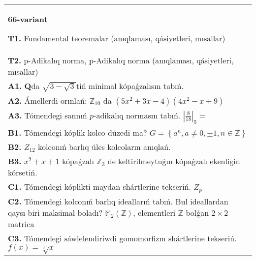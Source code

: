 \documentclass{article}
\begin{document}
\begin{tabular}{m{17cm}}
\textbf{66-variant}
\newline

\textbf{T1.} Fundamental teoremalar (anıqlaması, qásiyetleri, mısallar) \\
\textbf{T2.} p-Adikalıq norma, p-Adikalıq norma (anıqlaması, qásiyetleri, mısallar) \\
\textbf{A1.} \(\mathbf{Q}\)da \(\sqrt{3 - \sqrt{3}}\)tiń minimal kópaǵzalısın tabıń. \\
\textbf{A2.} Ámellerdi orınlań: \(\mathbb{Z}_{10}\) da \(\left( 5x^{2} + 3x - 4 \right)\left( 4x^{2} - x + 9 \right)\) \\
\textbf{A3.} Tómendegi sannıń \(p\)-adikalıq normasın tabıń. \(|\frac{8}{18}|_{5} =\) \\
\textbf{B1.} Tómendegi kóplik kolco dúzedi ma? \(G = \left\{ a^{n},a \neq 0, \pm 1,n \in \mathbb{Z} \right\}\) \\
\textbf{B2.} \(Z_{12}\) kolconıń barlıq úles kolcoların anıqlań. \\
\textbf{B3.} \(x^{2} + x + 1\) kópaǵzalı \(\mathbb{Z}_{3}\) de keltirilmeytuǵın kópaǵzalı ekenligin kórsetiń. \\
\textbf{C1.} Tómendegi kóplikti maydan shártlerine tekseriń. \(Z_{p}\) \\
\textbf{C2.} Tómendegi kolconıń barlıq ideallarıń tabıń. Bul ideallardan qaysı-biri maksimal boladı? \(\mathbb{M}_{2}\left( \mathbb{Z} \right)\), elementleri \(\mathbb{Z}\) bolǵan \(2 \times 2\) matrica \\
\textbf{C3.} Tómendegi sáwlelendiriwdi gomomorfizm shártlerine tekseriń. \(f(x) = \sqrt[3]{x}\) \\

\end{tabular}
\vspace{1cm}
\end{document}
